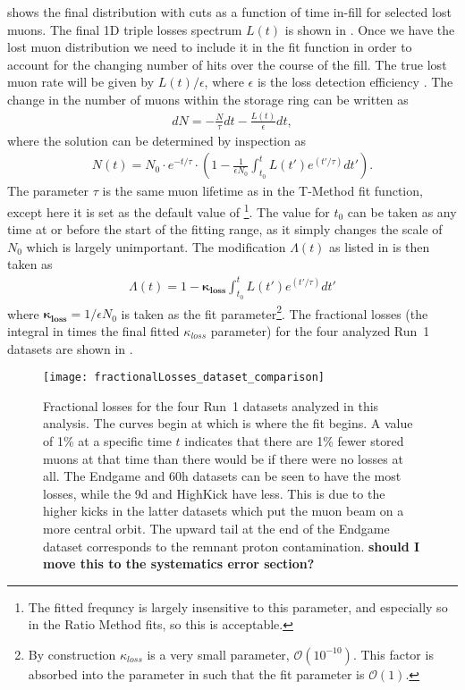  shows the final \DT distribution with cuts as a function of time in-fill for selected lost muons. The final 1D triple losses spectrum $L(t)$ is shown in . Once we have the lost muon distribution we need to include it in the fit function in order to account for the changing number of hits over the course of the fill. The true lost muon rate will be given by $L(t)/\epsilon$, where $\epsilon$ is the loss detection efficiency \cite{AFThesis}. The change in the number of muons within the storage ring can be written as 
    \begin{align} 
        dN = -\frac{N}{\tau} dt - \frac{L(t)}{\epsilon} dt, 
    \end{align}
where the solution can be determined by inspection as
    \begin{align} 
        N(t) = N_{0} \cdot e^{-t/\tau} \cdot (1 - \frac{1}{\epsilon N_{0}} \int_{t_{0}}^{t} L(t')e^{(t'/\tau)} dt').
    \end{align}
The parameter $\tau$ is the same muon lifetime as in the T-Method fit function, except here it is set as the default value of \footnote{The fitted \wa frequncy is largely insensitive to this parameter, and especially so in the Ratio Method fits, so this is acceptable.}. The value for $t_{0}$ can be taken as any time at or before the start of the fitting range, as it simply changes the scale of $N_{0}$ which is largely unimportant. The modification $\Lambda(t)$ as listed in  is then taken as
    \begin{align} \label{eq:lambdalosses}
        \Lambda(t) = 1 - \boldsymbol{\kappa_{loss}} \int_{t_{0}}^{t} L(t')e^{(t'/\tau)} dt'
    \end{align}
where $\boldsymbol{\kappa_{loss}} = 1/\epsilon N_{0}$ is taken as the fit parameter\footnote{By construction $\kappa_{loss}$ is a very small parameter, $\mathcal{O}(10^{-10})$. This factor is absorbed into the parameter in such that the fit parameter is $\mathcal{O}(1)$.}. The fractional losses (the integral in  times the final fitted $\kappa_{loss}$ parameter) for the four analyzed Run~1 datasets are shown in .



\begin{figure}[]
    \centering
    \texttt{[image: fractionalLosses\_dataset\_comparison]}
    \caption[Fractional muon losses in the analyzed Run~1 datasets]{Fractional losses for the four Run~1 datasets analyzed in this analysis. The curves begin at  which is where the fit begins. A value of 1\% at a specific time $t$ indicates that there are 1\% fewer stored muons at that time than there would be if there were no losses at all. The Endgame and 60h datasets can be seen to have the most losses, while the 9d and HighKick have less. This is due to the higher kicks in the latter datasets which put the muon beam on a more central orbit. The upward tail at the end of the Endgame dataset corresponds to the remnant proton contamination. \textbf{should I move this to the systematics error section?}}
    \label{fig:fractionallosses}
\end{figure}



